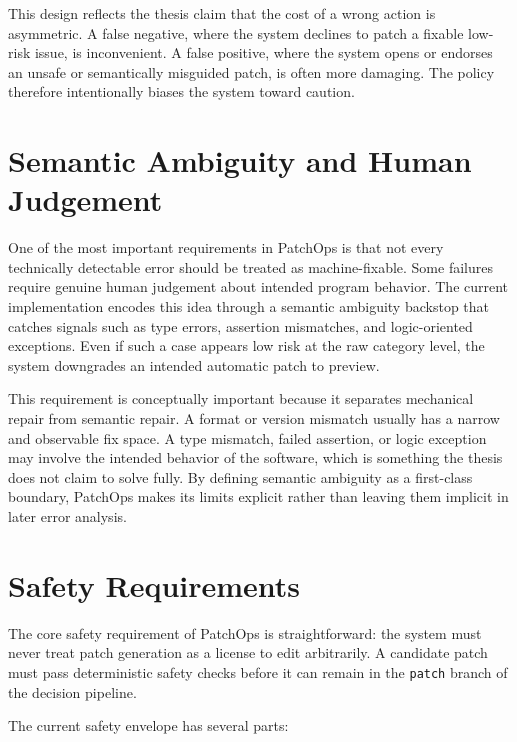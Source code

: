 This design reflects the thesis claim that the cost of a wrong action is asymmetric. A false negative, where
the system declines to patch a fixable low-risk issue, is inconvenient. A false positive, where the system
opens or endorses an unsafe or semantically misguided patch, is often more damaging. The policy therefore
intentionally biases the system toward caution.

\section{Semantic Ambiguity and Human Judgement}

One of the most important requirements in PatchOps is that not every technically detectable error should be
treated as machine-fixable. Some failures require genuine human judgement about intended program behavior. The
current implementation encodes this idea through a semantic ambiguity backstop that catches signals such as type
errors, assertion mismatches, and logic-oriented exceptions. Even if such a case appears low risk at the raw
category level, the system downgrades an intended automatic patch to preview.

This requirement is conceptually important because it separates mechanical repair from semantic repair. A format
or version mismatch usually has a narrow and observable fix space. A type mismatch, failed assertion, or logic
exception may involve the intended behavior of the software, which is something the thesis does not claim to
solve fully. By defining semantic ambiguity as a first-class boundary, PatchOps makes its limits explicit rather
than leaving them implicit in later error analysis.

\section{Safety Requirements}

The core safety requirement of PatchOps is straightforward: the system must never treat patch generation as a
license to edit arbitrarily. A candidate patch must pass deterministic safety checks before it can remain in the
\texttt{patch} branch of the decision pipeline.

The current safety envelope has several parts:

